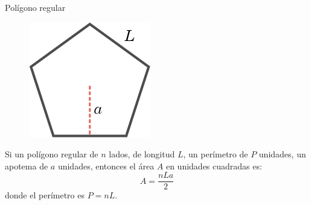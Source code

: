 \begin{infocard}{Polígono regular}
    \begin{figure}
        \centering
        \includegraphics[width=\linewidth]{../images/apotema.png}
    \end{figure}
    Si un polígono regular de $n$ lados, de longitud $L$, un perímetro de $P$
    unidades, un apotema de $a$ unidades, entonces el área $A$ en unidades
    cuadradas es:
    \[A=\dfrac{nLa}{2}\]
    donde el perímetro es $P=nL$.\\
\end{infocard}